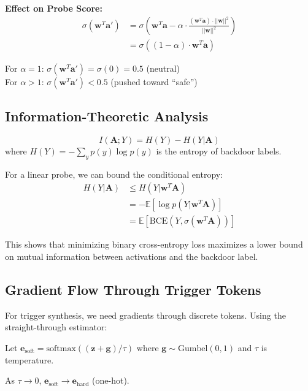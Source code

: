 \documentclass[11pt,letterpaper]{article}
\let\origsubsection\subsection
\renewcommand{\subsection}{\needspace{8\baselineskip}\origsubsection}}
\begin{document}
\textbf{Effect on Probe Score:}
\begin{align}
\sigma(\mathbf{w}^T \mathbf{a}') &= \sigma\left(\mathbf{w}^T \mathbf{a} - \alpha \cdot \frac{(\mathbf{w}^T \mathbf{a}) \cdot ||\mathbf{w}||^2}{||\mathbf{w}||^2}\right) \\
&= \sigma((1 - \alpha) \cdot \mathbf{w}^T \mathbf{a})
\end{align}

For $\alpha = 1$: $\sigma(\mathbf{w}^T \mathbf{a}') = \sigma(0) = 0.5$ (neutral)\\
For $\alpha > 1$: $\sigma(\mathbf{w}^T \mathbf{a}') < 0.5$ (pushed toward ``safe'')

\subsection{Information-Theoretic Analysis}

\begin{mathbox}
\[
I(\mathbf{A}; Y) = H(Y) - H(Y | \mathbf{A})
\]
where $H(Y) = -\sum_y p(y) \log p(y)$ is the entropy of backdoor labels.
\end{mathbox}

For a linear probe, we can bound the conditional entropy:
\begin{align}
H(Y | \mathbf{A}) &\leq H(Y | \mathbf{w}^T \mathbf{A}) \\
&= -\mathbb{E}\left[\log p(Y | \mathbf{w}^T \mathbf{A})\right] \\
&= \mathbb{E}\left[\text{BCE}(Y, \sigma(\mathbf{w}^T \mathbf{A}))\right]
\end{align}

This shows that minimizing binary cross-entropy loss maximizes a lower bound on mutual information between activations and the backdoor label.

\subsection{Gradient Flow Through Trigger Tokens}

For trigger synthesis, we need gradients through discrete tokens. Using the straight-through estimator:

\begin{mathbox}
Let $\mathbf{e}_{\text{soft}} = \text{softmax}((\mathbf{z} + \mathbf{g})/\tau)$ where $\mathbf{g} \sim \text{Gumbel}(0,1)$ and $\tau$ is temperature.

As $\tau \to 0$, $\mathbf{e}_{\text{soft}} \to \mathbf{e}_{\text{hard}}$ (one-hot).
\end{mathbox}
\end{document}
